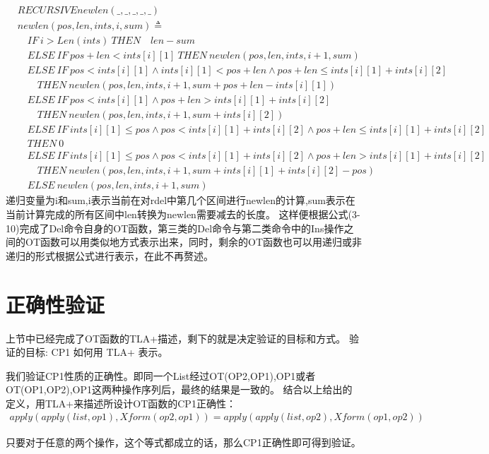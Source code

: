 \begin{align*}  
&RECURSIVE newlen(\_,\_,\_,\_,\_)     \\
&newlen(pos,len,ints,i,sum) \triangleq\\
    & \quad IF\ i > Len(ints) \ THEN \quad len - sum\\
    & \quad ELSE \ IF \ pos + len < ints[i][1] \ THEN \ newlen(pos,len,ints,i+1,sum)\\
    & \quad ELSE \ IF \ pos < ints[i][1] \land ints[i][1] < pos + len \land pos + len \le ints[i][1] + ints[i][2]\\
    & \quad \quad THEN \ newlen(pos,len,ints,i+1,sum + pos + len -ints[i][1])\\
    & \quad ELSE \ IF \ pos < ints[i][1] \land pos + len > ints[i][1] + ints[i][2]\\
    & \quad \quad THEN \ newlen(pos,len,ints,i+1,sum + ints[i][2])\\
    & \quad ELSE \ IF \ ints[i][1] \le pos \land pos < ints[i][1] + ints[i][2] \land pos + len \le ints[i][1] + ints[i][2]\\
    & \quad THEN \ 0\\
    & \quad ELSE \ IF\ ints[i][1] \le pos \land pos < ints[i][1] + ints[i][2] \land pos + len > ints[i][1] + ints[i][2] \\
    & \quad \quad THEN \ newlen(pos,len,ints,i+1,sum + ints[i][1] + ints[i][2] - pos)    \\
    & \quad ELSE \ newlen(pos,len,ints,i+1,sum)
\end{align*}
递归变量为i和sum,i表示当前在对rdel中第几个区间进行newlen的计算,sum表示在当前计算完成的所有区间中len转换为newlen需要减去的长度。
这样便根据公式(3-10)完成了Del命令自身的OT函数，第三类的Del命令与第二类命令中的Ins操作之间的OT函数可以用类似地方式表示出来，同时，剩余的OT函数也可以用递归或非递归的形式根据公式进行表示，在此不再赘述。
\section{正确性验证}
上节中已经完成了OT函数的TLA+描述，剩下的就是决定验证的目标和方式。
验证的目标: CP1 如何用 TLA+ 表示。

我们验证CP1性质的正确性。即同一个List经过OT(OP2,OP1),OP1或者OT(OP1,OP2),OP1这两种操作序列后，最终的结果是一致的。
结合以上给出的定义，用TLA+来描述所设计OT函数的CP1正确性：
\begin{align*}
  apply(apply(list,op1),Xform(op2, op1)) = apply(apply(list,op2),Xform(op1, op2))
\end{align*}
\par 只要对于任意的两个操作，这个等式都成立的话，那么CP1正确性即可得到验证。


